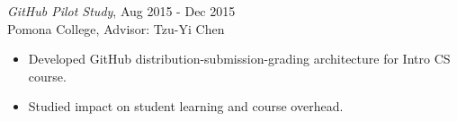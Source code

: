 {\sl GitHub Pilot Study}, \hfill Aug 2015 - Dec 2015 \\
Pomona College, Advisor: Tzu-Yi Chen
\begin{itemize}\itemsep -2pt
  \item Developed GitHub distribution-submission-grading architecture for Intro CS course.
  \item Studied impact on student learning and course overhead.
\end{itemize}
